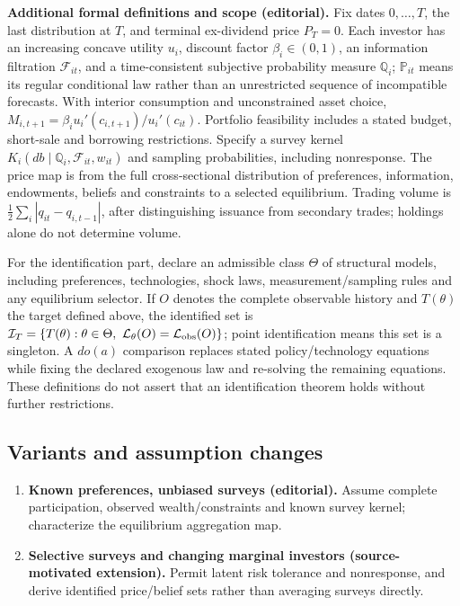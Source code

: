 \documentclass[11pt,a4paper]{article}
\begin{document}
\textbf{Additional formal definitions and scope (editorial).} Fix dates \(0,\ldots,T\), the last distribution at \(T\), and terminal ex-dividend price \(P_T=0\). Each investor has an increasing concave utility \(u_i\), discount factor \(\beta_i\in(0,1)\), an information filtration \(\mathcal F_{it}\), and a time-consistent subjective probability measure \(\mathbb Q_i\); \(\mathbb P_{it}\) means its regular conditional law rather than an unrestricted sequence of incompatible forecasts. With interior consumption and unconstrained asset choice, \(M_{i,t+1}=\beta_i u_i'(c_{i,t+1})/u_i'(c_{it})\). Portfolio feasibility includes a stated budget, short-sale and borrowing restrictions. Specify a survey kernel \(K_i(db\mid\mathbb Q_i,\mathcal F_{it},w_{it})\) and sampling probabilities, including nonresponse. The price map is from the full cross-sectional distribution of preferences, information, endowments, beliefs and constraints to a selected equilibrium. Trading volume is \(\frac12\sum_i|q_{it}-q_{i,t-1}|\), after distinguishing issuance from secondary trades; holdings alone do not determine volume.

For the identification part, declare an admissible class \(\Theta\) of structural models, including preferences, technologies, shock laws, measurement/sampling rules and any equilibrium selector. If \(O\) denotes the complete observable history and \(T(\theta)\) the target defined above, the identified set is \(\mathcal I_T=\{T(\theta):\theta\in\Theta,\ \mathcal L_\theta(O)=\mathcal L_{\rm obs}(O)\}\); point identification means this set is a singleton. A \(do(a)\) comparison replaces stated policy/technology equations while fixing the declared exogenous law and re-solving the remaining equations. These definitions do not assert that an identification theorem holds without further restrictions.
\subsection*{Variants and assumption changes}
\begin{enumerate}
\item \textbf{Known preferences, unbiased surveys (editorial).} Assume complete participation, observed wealth/constraints and known survey kernel; characterize the equilibrium aggregation map.
\item \textbf{Selective surveys and changing marginal investors (source-motivated extension).} Permit latent risk tolerance and nonresponse, and derive identified price/belief sets rather than averaging surveys directly.
\end{enumerate}
\end{document}
